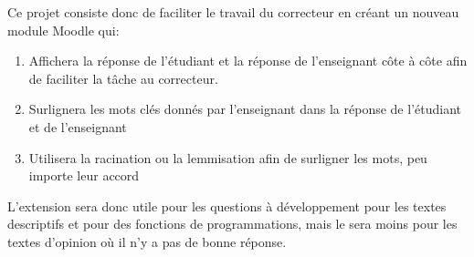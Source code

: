 Ce projet consiste donc de faciliter le travail du correcteur en créant un nouveau module Moodle qui:

\begin{enumerate}
  \item Affichera la réponse de l'étudiant et la réponse de l'enseignant côte à côte afin de faciliter la tâche au correcteur.
  \item Surlignera les mots clés donnés par l'enseignant dans la réponse de l'étudiant et de l'enseignant
  \item Utilisera la racination ou la lemmisation afin de surligner les mots, peu importe leur accord
\end{enumerate}

L'extension sera donc utile pour les questions à développement pour les textes descriptifs et pour des fonctions de programmations, mais le sera moins pour les textes d'opinion où il n'y a pas de \og bonne \fg{} réponse.